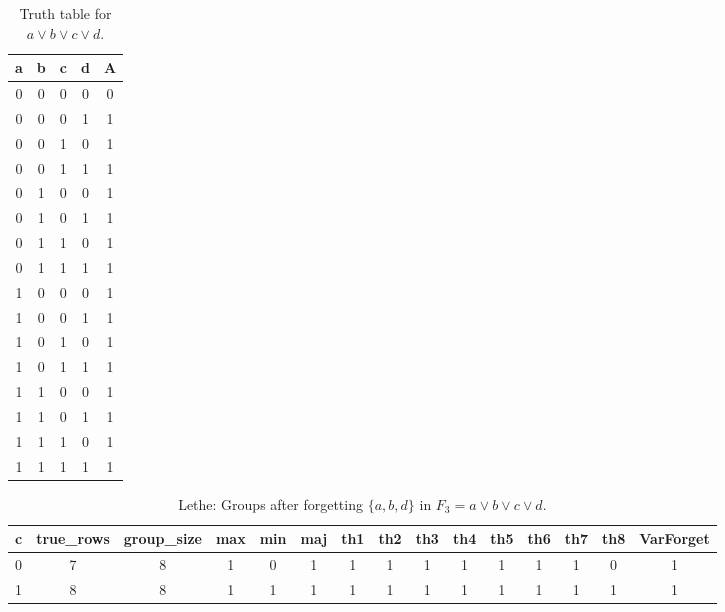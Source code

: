 \begin{table}[!tb]
    \centering
    \begin{tabular}{|c|c|c|c|c|}
        \hline
        \textbf{a} & \textbf{b} & \textbf{c} & \textbf{d} & \textbf{A} \\ \hline
        0 & 0 & 0 & 0 & 0 \\ \hline
        0 & 0 & 0 & 1 & 1 \\ \hline
        0 & 0 & 1 & 0 & 1 \\ \hline
        0 & 0 & 1 & 1 & 1 \\ \hline
        0 & 1 & 0 & 0 & 1 \\ \hline
        0 & 1 & 0 & 1 & 1 \\ \hline
        0 & 1 & 1 & 0 & 1 \\ \hline
        0 & 1 & 1 & 1 & 1 \\ \hline
        1 & 0 & 0 & 0 & 1 \\ \hline
        1 & 0 & 0 & 1 & 1 \\ \hline
        1 & 0 & 1 & 0 & 1 \\ \hline
        1 & 0 & 1 & 1 & 1 \\ \hline
        1 & 1 & 0 & 0 & 1 \\ \hline
        1 & 1 & 0 & 1 & 1 \\ \hline
        1 & 1 & 1 & 0 & 1 \\ \hline
        1 & 1 & 1 & 1 & 1 \\ \hline
    \end{tabular}
    \caption{Truth table for $a \lor b \lor c \lor d$.}
    \label{tab:truthtab}
\end{table}

\begin{table}[!tb]
    \centering
    \begin{tabular}{|c|c|c|c|c|c|c|c|c|c|c|c|c|c|c|}
        \hline
        \textbf{c} & \textbf{true\_rows} & \textbf{group\_size} & \textbf{max} & \textbf{min} & \textbf{maj} & \textbf{th1} & \textbf{th2} & \textbf{th3} & \textbf{th4} & \textbf{th5} & \textbf{th6} & \textbf{th7} & \textbf{th8} & \textbf{VarForget} \\ \hline
        \rowcolor{gray!40} 0 & 7 & 8 & 1 & 0 & 1 & 1 & 1 & 1 & 1 & 1 & 1 & 1 & 0 & 1 \\ \hline
        \rowcolor{blue!40} 1 & 8 & 8 & 1 & 1 & 1 & 1 & 1 & 1 & 1 & 1 & 1 & 1 & 1 & 1 \\ \hline
    \end{tabular}
    \caption{Lethe: Groups after forgetting $\{a, b, d\}$ in $F_{3} = a \lor b \lor c \lor d$.}
    \label{tab:lethe-F3-abd-groups}
\end{table}
